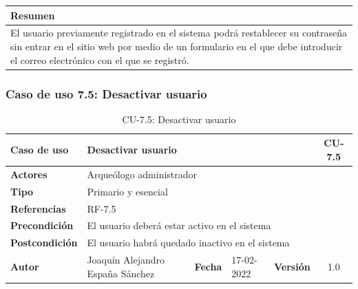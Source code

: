     \begin{table}[H]
        \centering
        \begin{tabularx}{\textwidth}{@{} |L |@{}} \hline
            \textbf{Resumen} \\
            \hline
            El usuario previamente registrado en el sistema podrá restablecer su contraseña sin
            entrar en el sitio web por medio de un formulario en el que debe introducir el correo
            electrónico con el que se registró. \\
            \hline
        \end{tabularx}
    \end{table}

\subsubsection{Caso de uso 7.5: Desactivar usuario}

    \begin{table}[H]
    \begin{center}
        \begin{adjustbox}{width=\textwidth}
        \begin{tabular}{ | l | l | l | l | c | c | } 
            \hline
            \textbf{Caso de uso} & \multicolumn{4}{l|}{Desactivar usuario} & \cellcolor{gray!50} \textbf{CU-7.5}\\
            \hline
            \textbf{Actores} & \multicolumn{5}{p{0.9\linewidth}|}{Arqueólogo administrador} \\
            \hline
            \textbf{Tipo} & \multicolumn{5}{l|}{Primario y esencial} \\
            \hline
            \textbf{Referencias} & \multicolumn{3}{l|}{RF-7.5} & \multicolumn{2}{l|}{ }\\
            \hline
            \textbf{Precondición} & \multicolumn{5}{l|}{El usuario deberá estar activo en el sistema} \\
            \hline
            \textbf{Postcondición} & \multicolumn{5}{l|}{El usuario habrá quedado inactivo en el sistema} \\
            \hline
            \textbf{Autor} & \multicolumn{1}{p{0.25\linewidth}|}{Joaquín Alejandro España Sánchez} & \textbf{Fecha} & 
            17-02-2022     & \textbf{Versión}                                                      & 1.0\\
            \hline
        \end{tabular}
        \end{adjustbox}
        \caption{CU-7.5: Desactivar usuario}
        \label{tab:deactivate-user}
    \end{center}
    \end{table}

